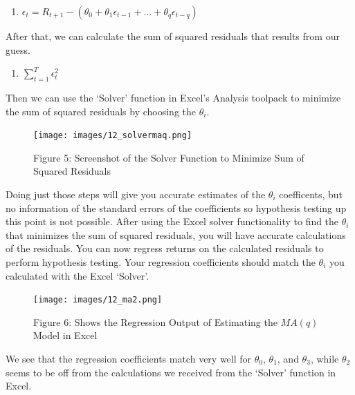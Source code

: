 \documentclass[
  letterpaper,
  DIV=11,
  numbers=noendperiod]{scrreprt}
\providecommand{\tightlist}{%
  \setlength{\itemsep}{0pt}\setlength{\parskip}{0pt}}\usepackage{longtable,booktabs,array}
\begin{document}
\begin{enumerate}
\def\labelenumi{\arabic{enumi}.}
\setcounter{enumi}{2}
\tightlist
\item
  \(\epsilon_{t} = R_{t+1} - (\theta_0 + \theta_1\epsilon_{t-1} + ... + \theta_q\epsilon_{t-q})\)
\end{enumerate}

After that, we can calculate the sum of squared residuals that results
from our guess.

\begin{enumerate}
\def\labelenumi{\arabic{enumi}.}
\setcounter{enumi}{3}
\tightlist
\item
  \(\sum_{t=1}^{T} \epsilon_t^2\)
\end{enumerate}

Then we can use the `Solver' function in Excel's Analysis toolpack to
minimize the sum of squared residuals by choosing the \(\theta_i\).

\begin{figure}[H]

{\centering \texttt{[image: images/12\_solvermaq.png]}

}

\caption{Figure 5: Screenshot of the Solver Function to Minimize Sum of
Squared Residuals}

\end{figure}%

Doing just those steps will give you accurate estimates of the
\(\theta_i\) coefficents, but no information of the standard errors of
the coefficients so hypothesis testing up this point is not possible.
After using the Excel solver functionality to find the \(\theta_i\) that
minimizes the sum of squared residuals, you will have accurate
calculations of the residuals. You can now regress returns on the
calculated residuals to perform hypothesis testing. Your regression
coefficients should match the \(\theta_i\) you calculated with the Excel
`Solver'.

\begin{figure}[H]

{\centering \texttt{[image: images/12\_ma2.png]}

}

\caption{Figure 6: Shows the Regression Output of Estimating the
\(MA(q)\) Model in Excel}

\end{figure}%

We see that the regression coefficients match very well for
\(\theta_0\), \(\theta_1\), and \(\theta_3\), while \(\theta_2\) seems
to be off from the calculations we received from the `Solver' function
in Excel.
\end{document}
